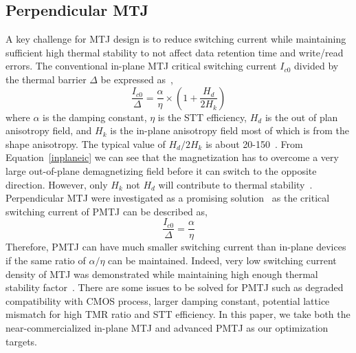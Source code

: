 \subsection{Perpendicular MTJ} \label{subsec:pmtj}
A key challenge for MTJ design is to reduce switching current while maintaining sufficient high thermal stability to not affect data retention time and write/read errors. The conventional in-plane MTJ critical switching current $I_{c0}$ divided by the thermal barrier $\Delta$ be expressed as~\cite{PMTJ:Grandis10},
\begin{equation}
\frac{I_{c0}}{\Delta} = \frac{\alpha}{\eta} \times (1+\frac{H_{d}}{2H_{k}})
\label{inplaneic}
\end{equation}
where $\alpha$ is the damping constant, $\eta$ is the STT efficiency, $H_{d}$ is the out of plan anisotropy field, and $H_{k}$ is the in-plane anisotropy field most of which is from the shape anisotropy. The typical value of $H_{d}/2H_{k}$ is about 20-150~\cite{STTRAM:Review10A}. From Equation~\ref{inplaneic} we can see that the magnetization has to overcome a very large out-of-plane demagnetizing field before it can switch to the opposite direction. However, only $H_{k}$ not $H_{d}$ will contribute to thermal stability~\cite{PMTJ:Grandis10}. Perpendicular MTJ were investigated as a promising solution~\cite{PMTJ:APL06,PMTJ:Grandis10,PMTJ:Toshiba08,PMTJ:Xiaochun06} as the critical switching current of PMTJ can be described as,
\begin{equation}
\frac{I_{c0}}{\Delta} = \frac{\alpha}{\eta}
\label{PMTJic}
\end{equation}
Therefore, PMTJ can have much smaller switching current than in-plane devices if the same ratio of $\alpha / \eta$ can be maintained. Indeed, very low switching current density of MTJ was demonstrated while maintaining high enough thermal stability factor~\cite{PMTJ:Toshiba08}. There are some issues to be solved for PMTJ such as degraded compatibility with CMOS process, larger damping constant, potential lattice mismatch for high TMR ratio and STT efficiency. In this paper, we take both the near-commercialized in-plane MTJ and advanced PMTJ as our optimization targets.







